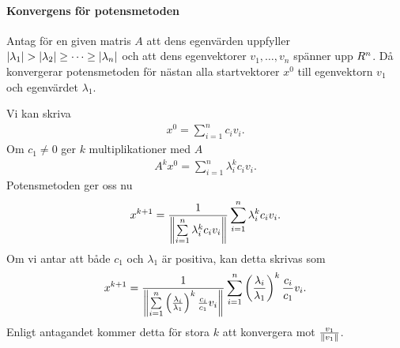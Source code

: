 \paragraph{Konvergens för potensmetoden}
Antag för en given matris $A$ att dens egenvärden uppfyller $\abs{\lambda_{1}} > \abs{\lambda_{2}} \geq \dots \geq \abs{\lambda_{n}}$ och att dens egenvektorer $v_{1}, \dots, v_{n}$ spänner upp $R^{n}$. Då konvergerar potensmetoden för nästan alla startvektorer $x^{0}$ till egenvektorn $v_{1}$ och egenvärdet $\lambda_{1}$.

\proof
Vi kan skriva
\begin{align*}
	x^{0} = \sum\limits_{i = 1}^{n}c_{i}v_{i}.
\end{align*}
Om $c_{1} \neq 0$ ger $k$ multiplikationer med $A$
\begin{align*}
	A^{k}x^{0} = \sum\limits_{i = 1}^{n}\lambda_{i}^{k}c_{i}v_{i}.
\end{align*}
Potensmetoden ger oss nu
\begin{align*}
	x^{k + 1} = \frac{1}{\norm{\sum\limits_{i = 1}^{n}\lambda_{i}^{k}c_{i}v_{i}}}\sum\limits_{i = 1}^{n}\lambda_{i}^{k}c_{i}v_{i}.
\end{align*}
Om vi antar att både $c_{1}$ och $\lambda_{1}$ är positiva, kan detta skrivas som
\begin{align*}
	x^{k + 1} = \frac{1}{\norm{\sum\limits_{i = 1}^{n}\left(\frac{\lambda_{i}}{\lambda_{1}}\right)^{k}\frac{c_{i}}{c_{1}}v_{i}}}\sum\limits_{i = 1}^{n}\left(\frac{\lambda_{i}}{\lambda_{1}}\right)^{k}\frac{c_{i}}{c_{1}}v_{i}.
\end{align*}
Enligt antagandet kommer detta för stora $k$ att konvergera mot $\frac{v_{1}}{\norm{v_{1}}}$.